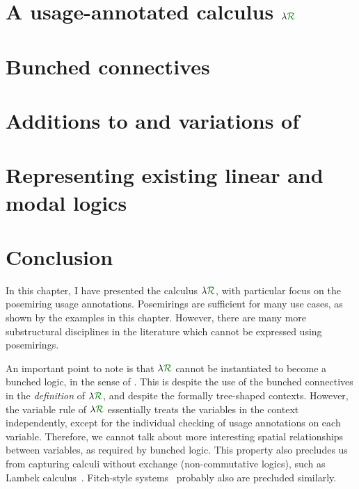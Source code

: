 
\section{A usage-annotated calculus $\name$}\label{sec:lr}

\section{Bunched connectives}\label{sec:lnd}

\section{Additions to and variations of \name{}}\label{sec:variant}

\section{Representing existing linear and modal logics}\label{sec:translation}


\section{Conclusion}\label{sec:semirings-conc}

In this chapter, I have presented the calculus $\name$, with particular focus on
the posemiring usage annotations.
Posemirings are sufficient for many use cases, as shown by the examples in this
chapter.
However, there are many more substructural disciplines in the literature which
cannot be expressed using posemirings.

An important point to note is that $\name$ cannot be instantiated to become a
bunched logic, in the sense of \citet{oHP99}.
This is despite the use of the bunched connectives in the \emph{definition} of
$\name$, and despite the formally tree-shaped contexts.
However, the variable rule of $\name$ essentially treats the variables in the
context independently, except for the individual checking of usage annotations
on each variable.
Therefore, we cannot talk about more interesting spatial relationships between
variables, as required by bunched logic.
This property also precludes us from capturing calculi without exchange
(non-commutative logics), such as Lambek calculus~\citep{Lambek58}.
Fitch-style systems~\citep{Borghuis-thesis} probably also are precluded
similarly.

